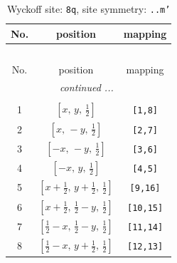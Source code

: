 \documentclass[fleqn,8pt]{jsarticle}
\begin{document}
\begin{longtable}{ccc}
\caption{Wyckoff site: {\tt 8q}, site symmetry: {\tt ..m'}}
 \\
 \hline \hline
No. & position & mapping \\ \hline \endfirsthead

\multicolumn{2}{l}{\tablename\ \thetable{}} \\
 \hline \hline
No. & position & mapping \\ \hline \endhead

 \hline \hline
\multicolumn{2}{r}{\footnotesize\it continued ...} \\ \endfoot

 \hline \hline
\multicolumn{2}{r}{} \\ \endlastfoot

1 & $\left[ x,\, y,\, \frac{1}{2} \right]$ & {\tt [1,8]} \\ \hline
2 & $\left[ x,\, - y,\, \frac{1}{2} \right]$ & {\tt [2,7]} \\ \hline
3 & $\left[ - x,\, - y,\, \frac{1}{2} \right]$ & {\tt [3,6]} \\ \hline
4 & $\left[ - x,\, y,\, \frac{1}{2} \right]$ & {\tt [4,5]} \\ \hline
5 & $\left[ x + \frac{1}{2},\, y + \frac{1}{2},\, \frac{1}{2} \right]$ & {\tt [9,16]} \\ \hline
6 & $\left[ x + \frac{1}{2},\, \frac{1}{2} - y,\, \frac{1}{2} \right]$ & {\tt [10,15]} \\ \hline
7 & $\left[ \frac{1}{2} - x,\, \frac{1}{2} - y,\, \frac{1}{2} \right]$ & {\tt [11,14]} \\ \hline
8 & $\left[ \frac{1}{2} - x,\, y + \frac{1}{2},\, \frac{1}{2} \right]$ & {\tt [12,13]} \\
\end{longtable}
\renewcommand{\arraystretch}{1.2}
\end{document}
